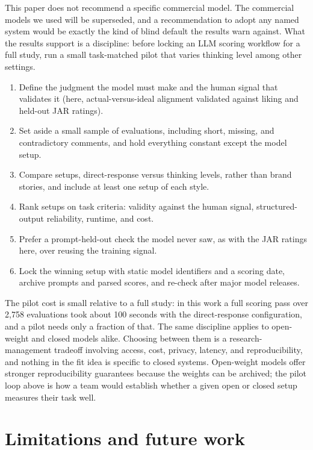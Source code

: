 \documentclass[11pt]{article}
\begin{document}
This paper does not recommend a specific commercial model. The commercial
models we used will be superseded, and a recommendation to adopt any named
system would be exactly the kind of blind default the results warn against.
What the results support is a discipline: before locking an LLM scoring
workflow for a full study, run a small task-matched pilot that varies thinking
level among other settings.

\begin{enumerate}
\item Define the judgment the model must make and the human signal that
validates it (here, actual-versus-ideal alignment validated against liking and
held-out JAR ratings).
\item Set aside a small sample of evaluations, including short, missing, and
contradictory comments, and hold everything constant except the model setup.
\item Compare setups, direct-response versus thinking levels, rather than
brand stories, and include at least one setup of each style.
\item Rank setups on task criteria: validity against the human signal,
structured-output reliability, runtime, and cost.
\item Prefer a prompt-held-out check the model never saw, as with the JAR
ratings here, over reusing the training signal.
\item Lock the winning setup with static model identifiers and a scoring date,
archive prompts and parsed scores, and re-check after major model releases.
\end{enumerate}

The pilot cost is small relative to a full study: in this work a full scoring
pass over 2,758 evaluations took about 100 seconds with the direct-response
configuration, and a pilot needs only a fraction of that. The same discipline
applies to open-weight and closed models alike. Choosing between them is a
research-management tradeoff involving access, cost, privacy, latency, and
reproducibility, and nothing in the fit idea is specific to closed systems.
Open-weight models offer stronger reproducibility guarantees because the
weights can be archived; the pilot loop above is how a team would establish
whether a given open or closed setup measures their task well.

\section{Limitations and future work}
\label{sec:limitations}
\end{document}
